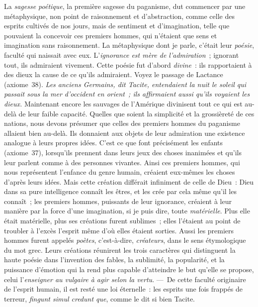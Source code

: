 \documentclass[french,twoside]{book} %
\begin{document}
 La {\itshape sagesse poétique}, la première sagesse du paganisme, dut commencer par une métaphysique, non point de raisonnement et d’abstraction, comme celle des esprits cultivés de nos jours, mais de sentiment et d’imagination, telle que pouvaient la concevoir ces premiers hommes, qui n’étaient que sens et imagination sans raisonnement. La métaphysique dont je parle, c’était leur {\itshape poésie}, faculté qui naissait avec eux. L’{\itshape ignorance est mère de l’admiration} ; ignorant tout, ils admiraient vivement. Cette poésie fut d’abord {\itshape divine} : ils rapportaient à des dieux la cause de ce qu’ils admiraient. Voyez le passage de Lactance (axiome 38). \emph{{\itshape Les anciens Germains}, dit Tacite, {\itshape  entendaient la nuit le soleil qui passait sous la mer d’occident en orient ; ils affirmaient aussi qu’ils voyaient les dieux.}} Maintenant encore les sauvages de l’Amérique divinisent tout ce qui est au-delà de leur faible capacité. Quelles que soient la simplicité et la grossièreté de ces nations, nous devons présumer que celles des premiers hommes du paganisme allaient bien au-delà. Ils donnaient aux objets de leur admiration une existence analogue à leurs propres idées. C’est ce que font précisément les enfants (axiome 37), lorsqu’ils prennent dans leurs jeux des choses inanimées et qu’ils leur parlent comme à des personnes vivantes. Ainsi ces premiers hommes, qui nous représentent l’enfance du genre humain, créaient eux-mêmes les choses d’après leurs idées. Mais cette création différait infiniment de celle de Dieu : Dieu dans sa pure  intelligence connaît les êtres, et les crée par cela même qu’il les connaît ; les premiers hommes, puissants de leur ignorance, créaient à leur manière par la force d’une imagination, si je puis dire, toute {\itshape matérielle}. Plus elle était matérielle, plus ses créations furent sublimes ; elles l’étaient au point de troubler à l’excès l’esprit même d’où elles étaient sorties. Aussi les premiers hommes furent appelés {\itshape poètes}, c’est-à-dire, {\itshape créateurs}, dans le sens étymologique du mot grec. Leurs créations réunirent les trois caractères qui distinguent la haute poésie dans l’invention des fables, la sublimité, la popularité, et la puissance d’émotion qui la rend plus capable d’atteindre le but qu’elle se propose, celui l’{\itshape enseigner au vulgaire à agir selon la vertu}. — De cette faculté originaire de l’esprit humain, il est resté une loi éternelle : les esprits une fois frappés de terreur, \emph{{\itshape fingunt simul credunt que}}, comme le dit si bien Tacite.\par
\end{document}
